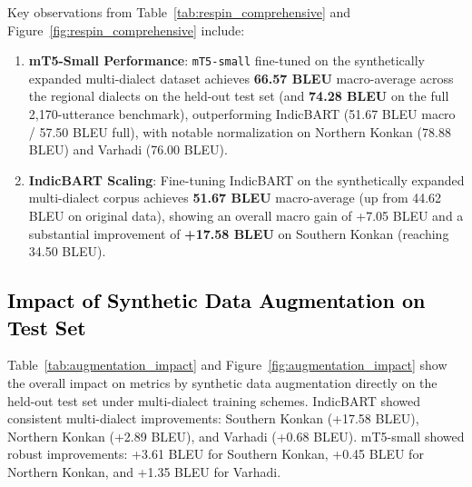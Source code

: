 \documentclass[11pt, a4paper]{article}
\begin{document}
Key observations from Table~\ref{tab:respin_comprehensive} and Figure~\ref{fig:respin_comprehensive} include:
\begin{enumerate}
    \item \textbf{mT5-Small Performance}: \texttt{mT5-small} fine-tuned on the synthetically expanded multi-dialect dataset achieves \textbf{66.57 BLEU} macro-average across the regional dialects on the held-out test set (and \textbf{74.28 BLEU} on the full 2,170-utterance benchmark), outperforming IndicBART (51.67 BLEU macro / 57.50 BLEU full), with notable normalization on Northern Konkan (78.88 BLEU) and Varhadi (76.00 BLEU).
    \item \textbf{IndicBART Scaling}: Fine-tuning IndicBART on the synthetically expanded multi-dialect corpus achieves \textbf{51.67 BLEU} macro-average (up from 44.62 BLEU on original data), showing an overall macro gain of +7.05 BLEU and a substantial improvement of \textbf{+17.58 BLEU} on Southern Konkan (reaching 34.50 BLEU).
\end{enumerate}

\subsection{\textcolor{black}{Impact of Synthetic Data Augmentation on Test Set}}
\label{subsec:augmentation_findings}

Table~\ref{tab:augmentation_impact} and Figure~\ref{fig:augmentation_impact} show the overall impact on metrics by synthetic data augmentation directly on the held-out test set under multi-dialect training schemes.
IndicBART showed consistent multi-dialect improvements: Southern Konkan (+17.58 BLEU), Northern Konkan (+2.89 BLEU), and Varhadi (+0.68 BLEU). 
mT5-small showed robust improvements: +3.61 BLEU for Southern Konkan, +0.45 BLEU for Northern Konkan, and +1.35 BLEU for Varhadi.
\end{document}
